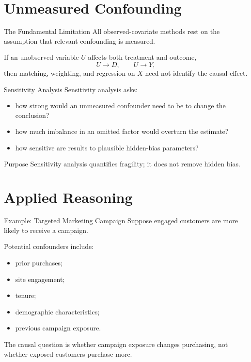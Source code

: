 \documentclass[aspectratio=169,11pt]{beamer}
\begin{document}
\section{Unmeasured Confounding}

\begin{frame}{The Fundamental Limitation}
All observed-covariate methods rest on the assumption that relevant confounding is measured.

If an unobserved variable \(U\) affects both treatment and outcome,
\[
U\rightarrow D,
\qquad
U\rightarrow Y,
\]
then matching, weighting, and regression on \(X\) need not identify the causal effect.
\end{frame}

\begin{frame}{Sensitivity Analysis}
Sensitivity analysis asks:
\begin{itemize}
\item how strong would an unmeasured confounder need to be to change the conclusion?
\item how much imbalance in an omitted factor would overturn the estimate?
\item how sensitive are results to plausible hidden-bias parameters?
\end{itemize}

\begin{block}{Purpose}
Sensitivity analysis quantifies fragility; it does not remove hidden bias.
\end{block}
\end{frame}

\section{Applied Reasoning}

\begin{frame}{Example: Targeted Marketing Campaign}
Suppose engaged customers are more likely to receive a campaign.

Potential confounders include:
\begin{itemize}
\item prior purchases;
\item site engagement;
\item tenure;
\item demographic characteristics;
\item previous campaign exposure.
\end{itemize}

The causal question is whether campaign exposure changes purchasing, not whether exposed customers purchase more.
\end{frame}
\end{document}
